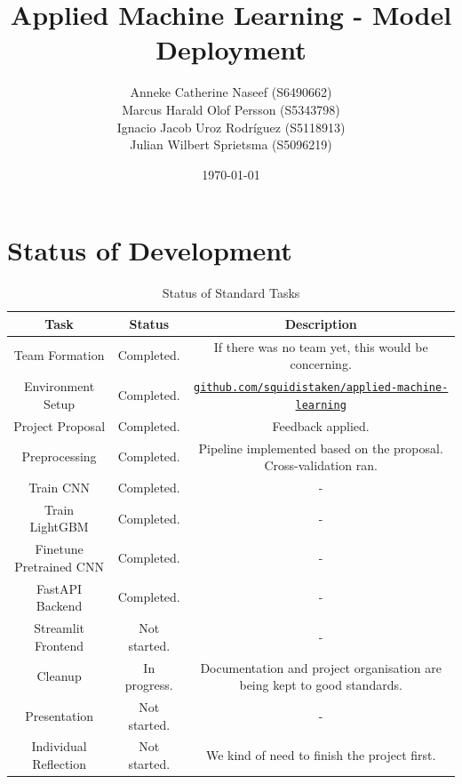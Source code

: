 \documentclass{article}
\title{\textbf{Applied Machine Learning - Model Deployment}}
\author{
        Anneke Catherine Naseef (S6490662) \\
        Marcus Harald Olof Persson (S5343798) \\
        Ignacio Jacob Uroz Rodríguez (S5118913) \\
        Julian Wilbert Sprietsma (S5096219) \\
}
\date{\today}
\begin{document}
\maketitle

\section{Status of Development}

\begin{table}[!h]
    \centering
    \begin{tabular}{|c|c|c|}
        \hline
        \textbf{Task} & \textbf{Status} & \textbf{Description} \\
        \hline
        \hline
        Team Formation & Completed. & If there was no team yet, this would be concerning. \\
        \hline
        Environment Setup & Completed. & \href{https://github.com/squidistaken/applied-machine-learning}{\texttt{github.com/squidistaken/applied-machine-learning}} \\
        \hline
        Project Proposal & Completed. & Feedback applied. \\
        \hline
        Preprocessing & Completed. & Pipeline implemented based on the proposal. Cross-validation ran. \\
        \hline
        Train CNN & Completed. & - \\
        \hline
        Train LightGBM & Completed. & - \\
        \hline
        Finetune Pretrained CNN & Completed. & - \\
        \hline
        FastAPI Backend & Completed. & - \\
        \hline
        Streamlit Frontend & Not started. & - \\
        \hline
        Cleanup & In progress. & Documentation and project organisation are being kept to good standards. \\
        \hline
        Presentation & Not started. & - \\
        \hline
        Individual Reflection & Not started. & We kind of need to finish the project first. \\
        \hline
    \end{tabular}
    \caption{Status of Standard Tasks}
    \label{tab:status_standard}
\end{table}
\end{document}
